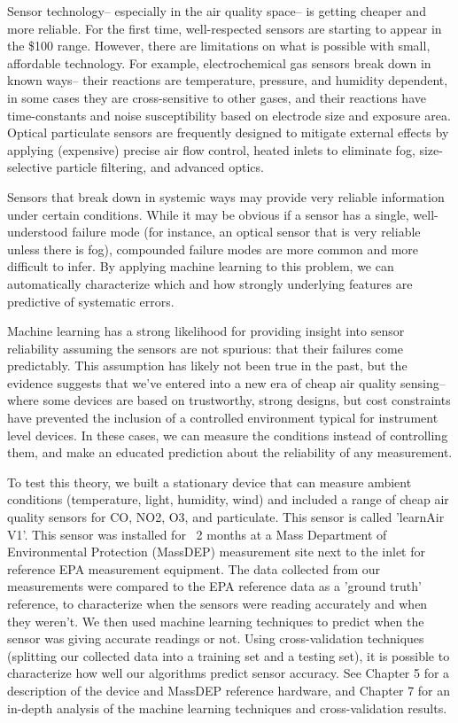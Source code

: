 Sensor technology-- especially in the air quality space-- is getting cheaper and more reliable.  For the first time, well-respected sensors are starting to appear in the \$100 range.  However, there are limitations on what is possible with small, affordable technology.  For example, electrochemical gas sensors break down in known ways-- their reactions are temperature, pressure, and humidity dependent, in some cases they are cross-sensitive to other gases, and their reactions have time-constants and noise susceptibility based on electrode size and exposure area.  Optical particulate sensors are frequently designed to mitigate external effects by applying (expensive) precise air flow control, heated inlets to eliminate fog, size-selective particle filtering, and advanced optics.

Sensors that break down in systemic ways may provide very reliable information under certain conditions.  While it may be obvious if a sensor has a single, well-understood failure mode (for instance, an optical sensor that is very reliable unless there is fog), compounded failure modes are more common and more difficult to infer.  By applying machine learning to this problem, we can automatically characterize which and how strongly underlying features are predictive of systematic errors.  

Machine learning has a strong likelihood for providing insight into sensor reliability assuming the sensors are not spurious: that their failures come predictably.  This assumption has likely not been true in the past, but the evidence suggests that we've entered into a new era of cheap air quality sensing-- where some devices are based on trustworthy, strong designs, but cost constraints have prevented the inclusion of a controlled environment typical for instrument level devices.  In these cases, we can measure the conditions instead of controlling them, and make an educated prediction about the reliability of any measurement.      

To test this theory, we built a stationary device that can measure ambient conditions (temperature, light, humidity, wind) and included a range of cheap air quality sensors for CO, NO2, O3, and particulate.  This sensor is called 'learnAir V1'.  This sensor was installed for ~2 months at a Mass Department of Environmental Protection (MassDEP) measurement site next to the inlet for reference EPA measurement equipment.  The data collected from our measurements were compared to the EPA reference data as a 'ground truth' reference, to characterize when the sensors were reading accurately and when they weren't.  We then used machine learning techniques to predict when the sensor was giving accurate readings or not. Using cross-validation techniques (splitting our collected data into a training set and a testing set), it is possible to characterize how well our algorithms predict sensor accuracy.  See Chapter 5 for a description of the device and MassDEP reference hardware, and Chapter 7 for an in-depth analysis of the machine learning techniques and cross-validation results.      
 
